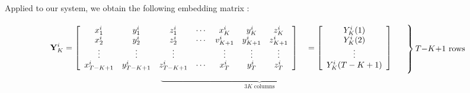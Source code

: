 Applied to our system, we obtain the following embedding matrix :

\begin{equation}
\mathbf{Y}_{K}^i =
\left[
\begin{array}{cccccccc}
x_1^i & y_1^i & z_1^i & \cdots & x_K^i & y_K^i & z_K^i \\
x_2^i & y_2^i & z_2^i & \cdots & v_{K+1}^i & y_{K+1}^i & z_{K+1}^i \\
\vdots & \vdots & \vdots &        & \vdots & \vdots & \vdots \\
x_{T-K+1}^i & y_{T-K+1}^i & z_{T-K+1}^i & \cdots & x_T^i & y_T^i & z_T^i \\
\end{array}
\right]
\quad
=
\left[
\begin{array}{c}
Y_K^i(1) \\
Y_K^i(2) \\
\vdots \\
Y_K^i(T-K+1)
\end{array}
\right]
\quad
\begin{array}{l}
\left. \rule{0pt}{3.5em} \right\} T{-}K{+}1 \text{ rows}
\end{array}
\end{equation}
\begin{equation}
\underbrace{\hspace{10cm}}_{3K \text{ columns}}
\end{equation}

